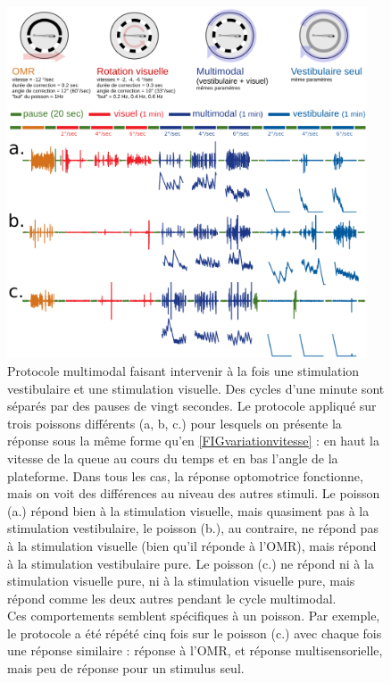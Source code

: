 \begin{figure}
    \centering
    \includegraphics[width=0.95\textwidth]{./files/protocole_multimodal.svg.png}
    \caption{
    Protocole multimodal faisant intervenir à la fois une stimulation vestibulaire et une stimulation visuelle. Des cycles d'une minute sont séparés par des pauses de vingt secondes.
    Le protocole appliqué sur trois poissons différents (a, b, c.) pour lesquels on présente la réponse sous la même forme qu'en \ref{FIGvariationvitesse} : en haut la vitesse de la queue au cours du temps et en bas l'angle de la plateforme. Dans tous les cas, la réponse optomotrice fonctionne, mais on voit des différences au niveau des autres stimuli. Le poisson (a.) répond bien à la stimulation visuelle, mais quasiment pas à la stimulation vestibulaire, le poisson (b.), au contraire, ne répond pas à la stimulation visuelle (bien qu'il réponde à l'OMR), mais répond à la stimulation vestibulaire pure. Le poisson (c.) ne répond ni à la stimulation visuelle pure, ni à la stimulation visuelle pure, mais répond comme les deux autres pendant le cycle multimodal.
    \\ Ces comportements semblent spécifiques à un poisson. Par exemple, le protocole a été répété cinq fois sur le poisson (c.) avec chaque fois une réponse similaire : réponse à l'OMR, et réponse multisensorielle, mais peu de réponse pour un stimulus seul.
    \label{FIGprotocolmulti}}
    \end{figure} 

